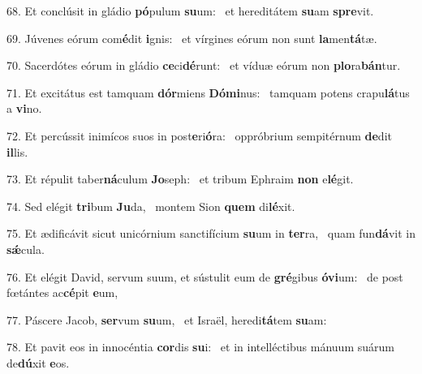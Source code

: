 68. Et conclúsit in gládio \textbf{pó}pulum \textbf{su}um: \ast\  et hereditátem \textbf{su}am \textbf{spre}vit.\

69. Júvenes eórum com\textbf{é}dit \textbf{i}gnis: \ast\  et vírgines eórum non sunt \textbf{la}men\textbf{tá}tæ.\

70. Sacerdótes eórum in gládio \textbf{ce}ci\textbf{dé}runt: \ast\  et víduæ eórum non \textbf{plo}ra\textbf{bán}tur.\

71. Et excitátus est tamquam \textbf{dór}miens \textbf{Dó}\textbf{mi}nus: \ast\  tamquam potens crapu\textbf{lá}tus a \textbf{vi}no.\

72. Et percússit inimícos suos in post\textbf{e}ri\textbf{ó}ra: \ast\  oppróbrium sempitérnum \textbf{de}dit \textbf{il}lis.\

73. Et répulit taber\textbf{ná}culum \textbf{Jo}seph: \ast\  et tribum Ephraim \textbf{non} e\textbf{lé}git.\

74. Sed elégit \textbf{tri}bum \textbf{Ju}da, \ast\  montem Sion \textbf{quem} di\textbf{lé}xit.\

75. Et ædificávit sicut unicórnium sanctifícium \textbf{su}um in \textbf{ter}ra, \ast\  quam fun\textbf{dá}vit in \textbf{sǽ}cula.\

76. Et elégit David, servum suum, et sústulit eum de \textbf{gré}gibus \textbf{ó}\textbf{vi}um: \ast\  de post fœtántes ac\textbf{cé}pit \textbf{e}um,\

77. Páscere Jacob, \textbf{ser}vum \textbf{su}um, \ast\  et Israël, heredi\textbf{tá}tem \textbf{su}am:\

78. Et pavit eos in innocéntia \textbf{cor}dis \textbf{su}i: \ast\  et in intelléctibus mánuum suárum de\textbf{dú}xit \textbf{e}os.\

